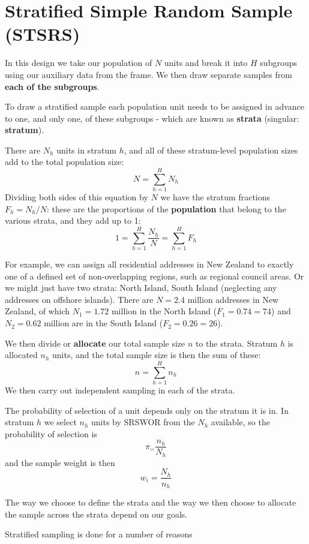 \documentclass[
]{book}
\begin{document}
\section{Stratified Simple Random Sample (STSRS)}\label{stratified-simple-random-sample-stsrs}

In this design we take our population of \(N\) units and break it into \(H\) subgroups
using our auxiliary data from the frame. We then draw separate samples from \textbf{each of
the subgroups}.

To draw a stratified sample each population unit needs to be assigned in advance
to one, and only one, of these subgroups - which are known as \textbf{strata}
(singular: \textbf{stratum}).

There are \(N_h\) units in stratum \(h\), and all of these stratum-level population sizes add to the
total population size:
\[
   N = \sum_{h=1}^H N_h
\]
Dividing both sides of this equation by \(N\) we have the stratum fractions \(F_h=N_h/N\): these are
the proportions of the \textbf{population} that belong to the various strata, and they add up to 1:
\[
   1 = \sum_{h=1}^H \frac{N_h}{N} = \sum_{h=1}^H F_h
\]

For example, we can assign all residential addresses in New Zealand to exactly one of
a defined set of non-overlapping regions, such as regional council areas. Or we might just have
two strata: North Island, South Island (neglecting any addresses on offshore islands). There are
\(N=2.4\) million addresses in New Zealand, of which \(N_1=1.72\) million in the North Island (\(F_1=0.74=74%
\))
and \(N_2=0.62\) million are in the South Island (\(F_2=0.26=26%
\)).

We then divide or \textbf{allocate} our total sample size \(n\) to the strata. Stratum \(h\) is allocated
\(n_h\) units, and the total sample size is then the sum of these:
\[
   n = \sum_{h=1}^H n_h
\]
We then carry out independent sampling in each of the strata.

The probability of selection of a unit depends only on the stratum it is in.
In stratum \(h\) we select \(n_h\) units by SRSWOR from the \(N_h\) available, so
the probability of selection is
\[
   \pi_ = \frac{n_h}{N_h}
\]
and the sample weight is then
\[
   w_i = \frac{N_h}{n_h}
\]

The way we choose to define the strata and the way we then choose to allocate the
sample across the strata depend on our goals.

Stratified sampling is done for a number of reasons
\end{document}
